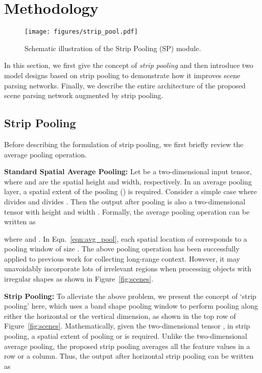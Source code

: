\documentclass[final]{cvpr}
\newcommand{\newparam}[1]{\vspace{5pt}\noindent\textbf{#1}}
\begin{document}
\section{Methodology} \label{sec:method}


\begin{figure*}
  \centering
  \texttt{[image: figures/strip\_pool.pdf]}
  \caption{
  Schematic illustration of the Strip Pooling (SP) module.
  }
  \label{fig:strip_pool}
\end{figure*}
In this section, we first give the concept of \emph{strip pooling} and then introduce two model designs based on strip pooling to demonstrate how it improves scene parsing networks.
Finally, we describe the entire architecture of the proposed scene parsing network augmented by strip pooling.

\subsection{Strip Pooling} \label{sec:strip_pooling}


Before describing the formulation of strip pooling, we first briefly review the average pooling operation.

\newparam{Standard Spatial Average Pooling:}
Let  be a two-dimensional input tensor, where  and  are the spatial height and width, respectively.
In an average pooling layer, a spatial extent of the pooling () is required.
Consider a simple case where  divides  and  divides . Then 
the output  after pooling is also a two-dimensional tensor with height  and width .
Formally, the average pooling operation can be 
written as 

where  and .
In Eqn.~\ref{eqn:avg_pool}, each spatial location of  corresponds to a pooling window of size .
The above pooling operation has been successfully applied to previous work \cite{zhao2016pyramid,he2019adaptive} for collecting long-range context.
However, it may unavoidably incorporate lots of irrelevant regions when processing objects with irregular shapes as shown in Figure~\ref{fig:scenes}.


\newparam{Strip Pooling:}
To alleviate the above problem, we present the concept of `strip pooling' here, which uses a band shape pooling window to perform pooling along either the horizontal or the vertical dimension, as shown in the top row of Figure~\ref{fig:scenes}.
Mathematically, given the two-dimensional tensor , in strip pooling, a spatial extent of pooling  or  is required.
Unlike the two-dimensional average pooling, the proposed strip pooling averages all the feature values in a row or a column. 
Thus, the output  after horizontal strip pooling can be written as
\end{document}
